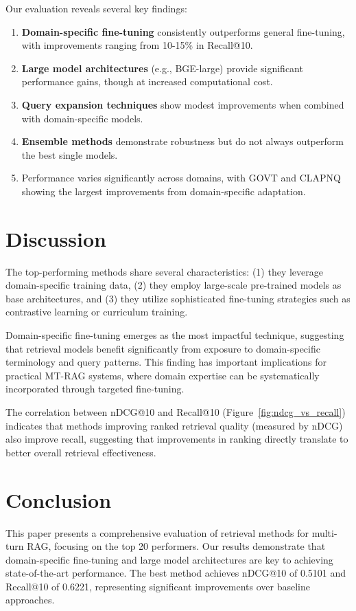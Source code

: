 \documentclass[conference]{IEEEtran}
\begin{document}
Our evaluation reveals several key findings:
\begin{enumerate}
    \item \textbf{Domain-specific fine-tuning} consistently outperforms general fine-tuning, with improvements ranging from 10-15\% in Recall@10.
    \item \textbf{Large model architectures} (e.g., BGE-large) provide significant performance gains, though at increased computational cost.
    \item \textbf{Query expansion techniques} show modest improvements when combined with domain-specific models.
    \item \textbf{Ensemble methods} demonstrate robustness but do not always outperform the best single models.
    \item Performance varies significantly across domains, with GOVT and CLAPNQ showing the largest improvements from domain-specific adaptation.
\end{enumerate}

\section{Discussion}

The top-performing methods share several characteristics: (1) they leverage domain-specific training data, (2) they employ large-scale pre-trained models as base architectures, and (3) they utilize sophisticated fine-tuning strategies such as contrastive learning or curriculum training. 

Domain-specific fine-tuning emerges as the most impactful technique, suggesting that retrieval models benefit significantly from exposure to domain-specific terminology and query patterns. This finding has important implications for practical MT-RAG systems, where domain expertise can be systematically incorporated through targeted fine-tuning.

The correlation between nDCG@10 and Recall@10 (Figure~\ref{fig:ndcg_vs_recall}) indicates that methods improving ranked retrieval quality (measured by nDCG) also improve recall, suggesting that improvements in ranking directly translate to better overall retrieval effectiveness.

\section{Conclusion}

This paper presents a comprehensive evaluation of retrieval methods for multi-turn RAG, focusing on the top 20 performers. Our results demonstrate that domain-specific fine-tuning and large model architectures are key to achieving state-of-the-art performance. The best method achieves nDCG@10 of 0.5101 and Recall@10 of 0.6221, representing significant improvements over baseline approaches.
\end{document}
